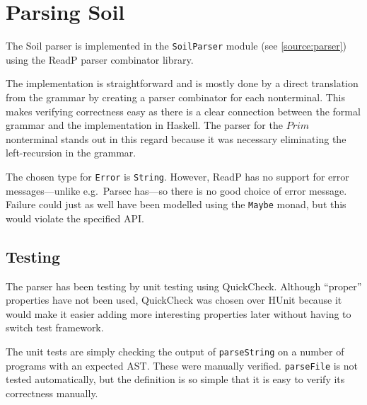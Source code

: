 
\section{Parsing Soil}

The Soil parser is implemented in the \verb|SoilParser| module (see
\autoref{source:parser}) using the ReadP parser combinator library.

The implementation is straightforward and is mostly done by a direct
translation from the grammar by creating a parser combinator for each
nonterminal. This makes verifying correctness easy as there is a clear
connection between the formal grammar and the implementation in Haskell. The
parser for the $Prim$ nonterminal stands out in this regard because it was
necessary eliminating the left-recursion in the grammar.

The chosen type for \verb|Error| is \verb|String|. However, ReadP has no
support for error messages---unlike e.g.\ Parsec has---so there is no good
choice of error message. Failure could just as well have been modelled using
the \verb|Maybe| monad, but this would violate the specified API.

\subsection{Testing}

The parser has been testing by unit testing using QuickCheck. Although
``proper'' properties have not been used, QuickCheck was chosen over HUnit
because it would make it easier adding more interesting properties later
without having to switch test framework.

The unit tests are simply checking the output of \verb|parseString| on a number
of programs with an expected AST. These were manually verified.
\verb|parseFile| is not tested automatically, but the definition is so simple
that it is easy to verify its correctness manually.

